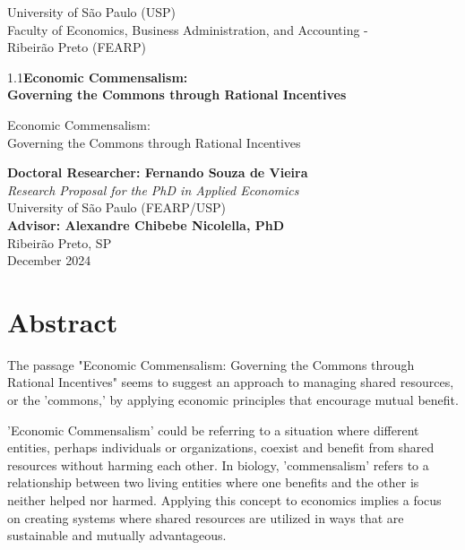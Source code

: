 \documentclass[a4paper,12pt]{article}
\newcommand{\institutionaltext}{
    {\large University of São Paulo (USP)\\[0.25cm]
    Faculty of Economics, Business Administration, and Accounting \--\\[0.25cm] 
    Ribeirão Preto (FEARP)}\\[2.5cm]
}
\begin{document}

\begin{titlepage}
    \centering
    \institutionaltext %
    
    \begin{spacing}{1.1}\Huge \textbf{Economic Commensalism:\\ Governing the Commons through Rational Incentives}\end{spacing}
    Economic Commensalism:\\
    Governing the Commons through Rational Incentives
    \vspace{1.5cm}

    {\large \textbf{Doctoral Researcher: Fernando Souza de Vieira}}\\[1.5cm]
    
    \textit{Research Proposal for the PhD in Applied Economics}\\
    University of São Paulo (FEARP/USP)\\[1.5cm]

    {\large \textbf{Advisor: Alexandre Chibebe Nicolella, PhD}}\\[3cm]
    
    Ribeirão Preto, SP\\
    December 2024

\end{titlepage}

\tableofcontents
\newpage


\section*{Abstract}
The passage "Economic Commensalism: Governing the Commons through Rational Incentives" seems to suggest an approach to managing shared resources, or the 'commons,' by applying economic principles that encourage mutual benefit. 

'Economic Commensalism' could be referring to a situation where different entities, perhaps individuals or organizations, coexist and benefit from shared resources without harming each other. In biology, 'commensalism' refers to a relationship between two living entities where one benefits and the other is neither helped nor harmed. Applying this concept to economics implies a focus on creating systems where shared resources are utilized in ways that are sustainable and mutually advantageous.
\end{document}

